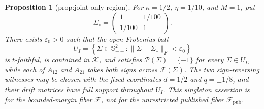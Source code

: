 \documentclass{article}
\newtheorem{proposition}{Proposition}
\begin{document}
\begin{proposition}[prop:joint-only-region]\label{prop:joint-only-region}
For \(\kappa=1/2\), \(\eta=1/10\), and \(M=1\), put
\[
\Sigma_{\circ}=\begin{pmatrix}1&1/100\\1/100&1\end{pmatrix}.
\]
There exists \(\varepsilon_0>0\) such that the open Frobenius ball
\[
U_I=\left\{\Sigma\in\mathbb S_{++}^{2}:\lVert\Sigma-\Sigma_{\circ}\rVert_F<\varepsilon_0\right\}
\]
is \(t\)-faithful, is contained in \(\mathcal K\), and satisfies \(\mathcal P(\Sigma)=\{-1\}\) for every \(\Sigma\in U_I\), while each of \(A_{12}\) and \(A_{21}\) takes both signs across \(\mathcal F(\Sigma)\). The two sign-reversing witnesses may be chosen with the fixed coordinates \(d=1/2\) and \(q=\pm1/8\), and their drift matrices have full support throughout \(U_I\). This singleton assertion is for the bounded-margin fiber \(\mathcal F\), not for the unrestricted published fiber \(\mathcal F_{\mathrm{pub}}\).
\end{proposition}
\end{document}
